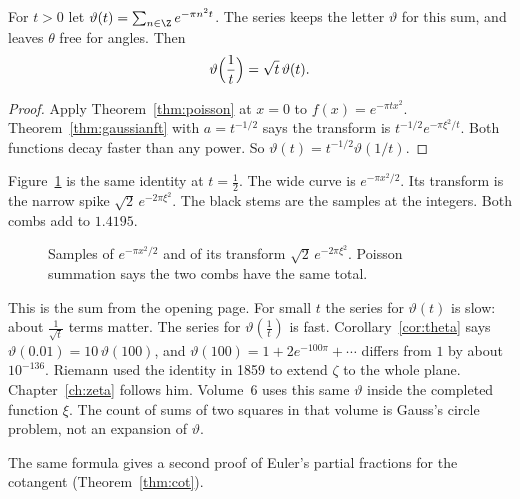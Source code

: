 \begin{corollary}\label{cor:theta}
For $t>0$ let $\vartheta(t)=\sum_{n\in\Z}e^{-\pi n^2t}$. The series keeps the letter $\vartheta$ for this sum, and leaves $\theta$ free for angles. Then
\[
\vartheta\Bigl(\frac1t\Bigr)=\sqrt t\,\vartheta(t).
\]
\end{corollary}
\begin{proof}
Apply Theorem~\ref{thm:poisson} at $x=0$ to $f(x)=e^{-\pi tx^2}$. Theorem~\ref{thm:gaussianft} with $a=t^{-1/2}$ says the transform is $t^{-1/2}e^{-\pi\xi^2/t}$. Both functions decay faster than any power. So $\vartheta(t)=t^{-1/2}\vartheta(1/t)$.
\end{proof}

Figure~\ref{fig:rw08-comb} is the same identity at $t=\frac12$. The wide curve is $e^{-\pi x^2/2}$. Its transform is the narrow spike $\sqrt2\,e^{-2\pi\xi^2}$. The black stems are the samples at the integers. Both combs add to $1.4195$.

\begin{figure}[ht]
\centering
{}
\caption{Samples of $e^{-\pi x^2/2}$ and of its transform $\sqrt{2}\,e^{-2\pi\xi^2}$. Poisson summation says the two combs have the same total.}
\label{fig:rw08-comb}
\end{figure}

This is the sum from the opening page. For small $t$ the series for $\vartheta(t)$ is slow: about $\frac1{\sqrt t}$ terms matter. The series for $\vartheta(\frac1t)$ is fast. Corollary~\ref{cor:theta} says $\vartheta(0.01)=10\,\vartheta(100)$, and $\vartheta(100)=1+2e^{-100\pi}+\cdots$ differs from $1$ by about $10^{-136}$. Riemann used the identity in 1859 to extend $\zeta$ to the whole plane. Chapter~\ref{ch:zeta} follows him. Volume~6 uses this same $\vartheta$ inside the completed function $\xi$. The count of sums of two squares in that volume is Gauss's circle problem, not an expansion of $\vartheta$.

The same formula gives a second proof of Euler's partial fractions for the cotangent (Theorem~\ref{thm:cot}).

